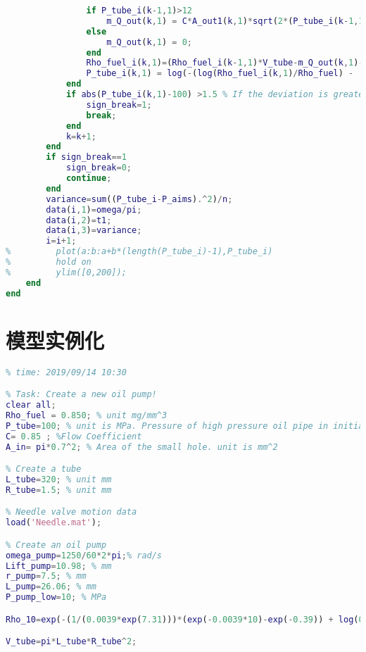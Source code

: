 \documentclass[withoutpreface,bwprint]{cumcmthesis} %
\begin{document}
\begin{appendices}
\begin{lstlisting}[language=matlab]
%                 A_out2(k,1) = pi*((h_Needle2(k,1)+1.25/(tan(pi*9/180)))*tan(pi*9/180))^2-pi*1.25^2;
                if P_tube_i(k-1,1)>12 
                    m_Q_out(k,1) = C*A_out1(k,1)*sqrt(2*(P_tube_i(k-1,1) - 12)*Rho_fuel_i(k-1,1))*b;
                else
                    m_Q_out(k,1) = 0;
                end
                Rho_fuel_i(k,1)=(Rho_fuel_i(k-1,1)*V_tube-m_Q_out(k,1)-m_Q_outD(k,1)+m_Q_in(k,1))/V_tube;
                P_tube_i(k,1) = log(-(log(Rho_fuel_i(k,1)/Rho_fuel) - (exp(-0.39)/(0.0039*exp(7.31))))*0.0039*exp(7.31))*(-1/0.0039);
            end
            if abs(P_tube_i(k,1)-100) >1.5 % If the deviation is greater than 5, the loop is jumped out and the next traversal is performed.
                sign_break=1;
                break;
            end
            k=k+1;
        end
        if sign_break==1
            sign_break=0;
            continue;
        end
        variance=sum((P_tube_i-P_aims).^2)/n;
        data(i,1)=omega/pi;
        data(i,2)=t1;
        data(i,3)=variance;
        i=i+1;
%         plot(a:b:a+b*(length(P_tube_i)-1),P_tube_i)
%         hold on
%         ylim([0,200]);
    end
end

\end{lstlisting}

\section{模型实例化} 
\begin{lstlisting}[language=matlab]
% 2019_A Model promotion, instantiation calculus.
% time: 2019/09/14 10:30

% Task: Create a new oil pump!
clear all;
Rho_fuel = 0.850; % unit mg/mm^3
P_tube=100; % unit is MPa. Pressure of high pressure oil pipe in initial state
C= 0.85 ; %Flow Coefficient
A_in= pi*0.7^2; % Area of the small hole. unit is mm^2

% Create a tube
L_tube=320; % unit mm
R_tube=1.5; % unit mm

% Needle valve motion data
load('Needle.mat');

% Create an oil pump
omega_pump=1250/60*2*pi;% rad/s
Lift_pump=10.98; % mm
r_pump=7.5; % mm
L_pump=26.06; % mm
P_pump_low=10; % MPa

Rho_10=exp(-(1/(0.0039*exp(7.31)))*(exp(-0.0039*10)-exp(-0.39)) + log(0.85)); % Fuel density at a pressure of 10 MPa

V_tube=pi*L_tube*R_tube^2;


\end{lstlisting}
\end{appendices}
\end{document}
